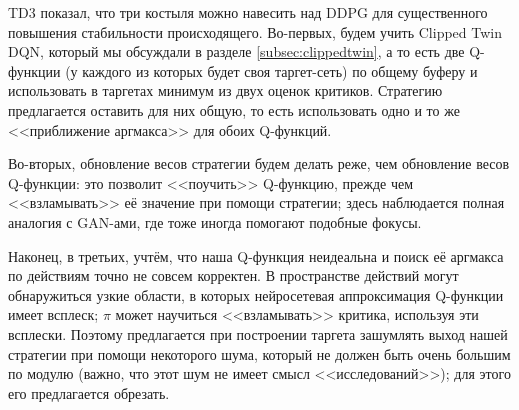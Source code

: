 TD3 показал, что три костыля можно навесить над DDPG для существенного повышения стабильности происходящего. Во-первых, будем учить Clipped Twin DQN, который мы обсуждали в разделе \ref{subsec:clippedtwin}, а то есть две Q-функции (у каждого из которых будет своя таргет-сеть) по общему буферу и использовать в таргетах минимум из двух оценок критиков. Стратегию предлагается оставить для них общую, то есть использовать одно и то же <<приближение аргмакса>> для обоих Q-функций. 

Во-вторых, обновление весов стратегии будем делать реже, чем обновление весов Q-функции: это позволит <<поучить>> Q-функцию, прежде чем <<взламывать>> её значение при помощи стратегии; здесь наблюдается полная аналогия с GAN-ами, где тоже иногда помогают подобные фокусы.


Наконец, в третьих, учтём, что наша Q-функция неидеальна и поиск её аргмакса по действиям точно не совсем корректен. В пространстве действий могут обнаружиться узкие области, в которых нейросетевая аппроксимация Q-функции имеет всплеск; $\pi$ может научиться <<взламывать>> критика, используя эти всплески. Поэтому предлагается при построении таргета зашумлять выход нашей стратегии при помощи некоторого шума, который не должен быть очень большим по модулю (важно, что этот шум не имеет смысл <<исследований>>); для этого его предлагается обрезать.

